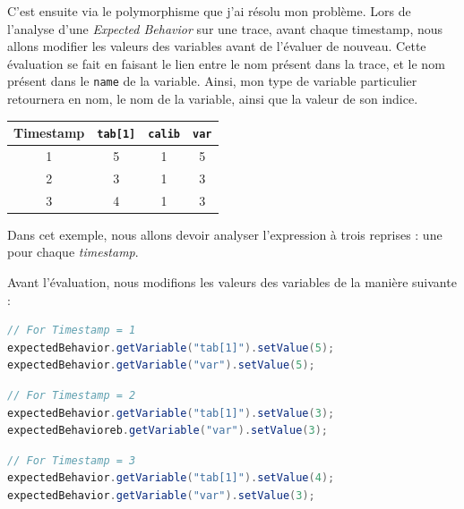 C'est ensuite via le polymorphisme que j'ai résolu mon problème. Lors de l'analyse d'une \textit{Expected Behavior} sur une trace, avant chaque timestamp, nous allons modifier les valeurs des variables avant de l'évaluer de nouveau. Cette évaluation se fait en faisant le lien entre le nom présent dans la trace, et le nom présent dans le \texttt{name} de la variable. Ainsi, mon type de variable particulier retournera en nom, le nom de la variable, ainsi que la valeur de son indice.

\begin{exemple}
\begin{tabular}{cccc}

Timestamp & \texttt{tab[1]} & \texttt{calib} & \texttt{var}\\
\hline
1 & 5      &   1   & 5\\
2  & 3 & 1 & 3\\
3  & 4 & 1 & 3
\end{tabular}

Dans cet exemple, nous allons devoir analyser l'expression à trois reprises : une pour chaque \textit{timestamp}.

Avant l'évaluation, nous modifions les valeurs des variables de la manière suivante : 
\begin{lstlisting}[framerule=0pt,language=java, numbers=none]
// For Timestamp = 1
expectedBehavior.getVariable("tab[1]").setValue(5);
expectedBehavior.getVariable("var").setValue(5);
\end{lstlisting}

\begin{lstlisting}[framerule=0pt,language=java, numbers=none]
// For Timestamp = 2
expectedBehavior.getVariable("tab[1]").setValue(3);
expectedBehavioreb.getVariable("var").setValue(3);
\end{lstlisting}

\begin{lstlisting}[framerule=0pt,language=java, numbers=none]
// For Timestamp = 3
expectedBehavior.getVariable("tab[1]").setValue(4);
expectedBehavior.getVariable("var").setValue(3);
\end{lstlisting}
\end{exemple}

